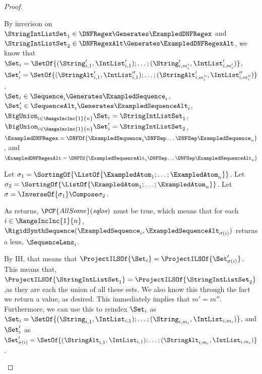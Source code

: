 \documentclass[sigplan,acmsmall]{acmart}
\begin{document}
\begin{proof}
\begin{case}[dnfregex]
    By inverison on 
    $\StringIntListSet_1 \in \DNFRegex \Generates \ExampledDNFRegex$ and
    $\StringIntListSet_2 \in \DNFRegexAlt \Generates \ExampledDNFRegexAlt$,
    we know that\\
    $\Set_i = \SetOf{(\String_{i,1}',\IntList_{i,1}');\ldots;(\String_{i,m_i'}',\IntList_{i,m_i'}')}$,\\
    $\Set_i' =
    \SetOf{(\StringAlt_{i,1}',\IntList_{i,1}'');\ldots;(\StringAlt_{i,m_i''}',\IntList_{i,m_i''}'')}$,\\
    $\Set_i \in \Sequence_i \Generates \ExampledSequence_i$,\\
    $\Set_i' \in \SequenceAlt_i \Generates \ExampledSequenceAlt_i$,\\
    $\BigUnion_{i\in\RangeIncInc{1}{n}}\Set_i = \StringIntListSet_1$,\\
    $\BigUnion_{i\in\RangeIncInc{1}{n}}\Set_i' = \StringIntListSet_2$,\\
    $\ExampledDNFRegex = \DNFOf{\ExampledSequence_1 \DNFSep \ldots \DNFSep
      \ExampledSequence_n}$, and\\
    $\ExampledDNFRegexAlt = \DNFOf{\ExampledSequenceAlt_1 \DNFSep \ldots \DNFSep
      \ExampledSequenceAlt_n}$

    Let $\sigma_1 =
    \SortingOf{\ListOf{\ExampledAtom_1;\ldots;\ExampledAtom_n}}$.
    Let $\sigma_2 =
    \SortingOf{\ListOf{\ExampledAtom_1;\ldots;\ExampledAtom_n}}$.
    Let $\sigma = \InverseOf{\sigma_1} \Compose \sigma_2$.

    As \RigidSynthInternal{} returns, $\PCF{AllSome}(\mathit{sqlos})$ must be true, which
    means that for each $i\in\RangeIncInc{1}{n}$,
    $\RigidSynthSequence(\ExampledSequence_i,\ExampledSequenceAlt_{\sigma(i)})$ returns a
    lens, $\SequenceLens_i$.
    
    By IH, that means that
    $\ProjectILSOf{\Set_i}
    =
    \ProjectILSOf{\Set_{\sigma(i)}'}$.
    This means that, $\ProjectILSOf{\StringIntListSet_1} =
    \ProjectILSOf{\StringIntListSet_2}$,as they are each the union of all these
    sets.   We also know this through the fact we
    return a value, as desired.
    This immediately implies that $m' = m''$.
    Furthermore, we can use this to reindex $\Set_i$ as
    $\Set_i =
    \SetOf{(\String_{i,1},\IntList_{i,1});\ldots;(\String_{i,m_i},\IntList_{i,m_i})}$,
    and $\Set_i'$ as
    $\Set_{\sigma(i)}' =
    \SetOf{(\StringAlt_{i,1},\IntList_{i,1});\ldots;(\StringAlt_{i,m_i},\IntList_{i,m_i})}$.


\end{case}
\end{proof}
\end{document}

